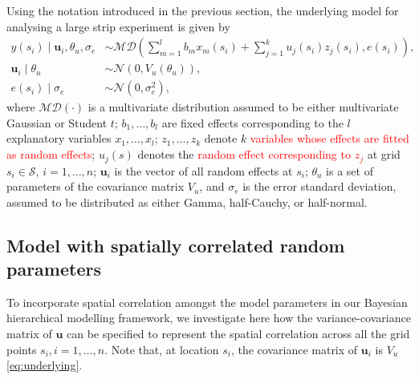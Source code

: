 \documentclass[a4paper]{article}   	%
\newcommand{\N}{\mathcal{N}}
\begin{document}
	Using the notation introduced in the previous section, the underlying model for analysing a large strip experiment is given by 
	\begin{equation}\label{eq:underlying}
		\begin{split}
			y(s_i)\mid \bm{u}_i,\theta_u,\sigma_e &\sim \mathcal{MD}\left( \sum_{m=1}^{l}b_m x_m(s_i) + \sum_{j=1}^{k}u_j(s_i)z_j(s_i),e(s_i)\right), \\
			\bm{u}_i \mid \theta_u &\sim \N(0,V_u(\theta_u)), \\
			e(s_i) \mid \sigma_e &\sim \N(0,\sigma_e^2), 
		\end{split}
	\end{equation}
	where $\mathcal{MD}(\cdot)$ is a multivariate distribution assumed to be either multivariate Gaussian or Student $t$; $b_1, \ldots, b_l$ are fixed effects corresponding to the $l$ explanatory variables $x_1,\ldots, x_l$; $z_1,\ldots, z_k$ denote $k$ \textcolor{red}{variables whose effects are fitted as random effects}; $u_j(s)$ denotes the \textcolor{red}{random effect corresponding to $z_j$} at grid $s_i\in\mathcal{S}$, $i=1,\ldots,n$; $\bm{u}_i$ is the vector of all random effects at $s_i$; $\theta_u$ is a set of parameters of the covariance matrix $V_u$, and $\sigma_e$ is the error standard deviation, assumed to be distributed as either Gamma, half-Cauchy, or half-normal. 
	
	
	
	\subsection{Model with spatially correlated random parameters}
	
	
	To incorporate spatial correlation amongst the model parameters in our Bayesian hierarchical modelling framework, we investigate here how the variance-covariance matrix of $\bm{u}$ can be specified to represent the spatial correlation across all the grid points $s_i, i=1,\ldots,n$. Note that, at location $s_i$, the covariance matrix of $\bm{u}_i$ is $V_u$ \eqref{eq:underlying}. %
	
\end{document}
